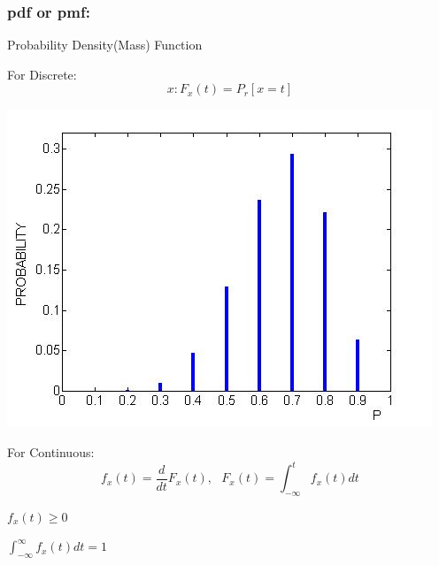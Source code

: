 \documentclass{article}
\begin{document}
{        \subsubsection{pdf or pmf: }{
            Probability Density(Mass) Function\\
            
            \begin{enumerate}{
                \item For Discrete:
                    \[ x: F_x(t)= P_r[x= t] \]
                    \begin{center}{
                        \includegraphics[scale=0.3]{dis-pdf.jpg}
                    }
                    \end{center}
                \item For Continuous: 
                    \[ f_x(t) = \frac{d}{dt}F_x(t), \text{ } F_x(t)=\int_{-\infty}^{t}f_x(t)dt \]
                    \begin{enumerate}[i]{
                        \item $f_x(t)\ge 0$
                        \item $\int_{-\infty}^{\infty}f_x(t)dt= 1$
                    }
                    \end{enumerate}

}
\end{enumerate}}}
\end{document}
